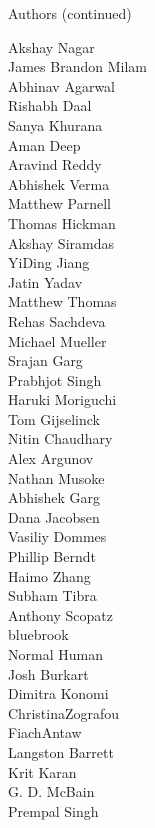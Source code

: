 \begin{frame}{Authors (continued)}
\begin{multicols}{5}
Akshay Nagar\\
James Brandon Milam\\
Abhinav Agarwal\\
Rishabh Daal\\
Sanya Khurana\\
Aman Deep\\
Aravind Reddy\\
Abhishek Verma\\
Matthew Parnell\\
Thomas Hickman\\
Akshay Siramdas\\
YiDing Jiang\\
Jatin Yadav\\
Matthew Thomas\\
Rehas Sachdeva\\
Michael Mueller\\
Srajan Garg\\
Prabhjot Singh\\
Haruki Moriguchi\\
Tom Gijselinck\\
Nitin Chaudhary\\
Alex Argunov\\
Nathan Musoke\\
Abhishek Garg\\
Dana Jacobsen\\
Vasiliy Dommes\\
Phillip Berndt\\
Haimo Zhang\\
Subham Tibra\\
Anthony Scopatz\\
bluebrook\\
Normal Human\\
Josh Burkart\\
Dimitra Konomi\\
ChristinaZografou\\
FiachAntaw\\
Langston Barrett\\
Krit Karan\\
G. D. McBain\\
Prempal Singh\\
\end{multicols}
\end{frame}
